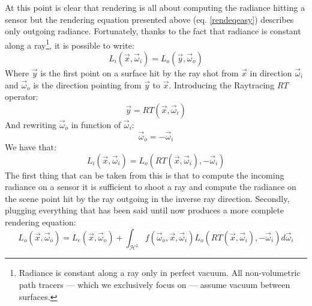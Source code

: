 At this point is clear that rendering is all about computing the radiance hitting a sensor but the rendering equation presented above (eq. \ref{rendeqeasy}) describes only outgoing radiance. Fortunately, thanks to the fact that radiance is constant along a ray\footnote{Radiance is constant along a ray only in perfect vacuum. All non-volumetric path tracers --- which we exclusively focus on --- assume vacuum between surfaces.}, it is possible to write:
\begin{equation}
	L_i(\vec{x},\vec{\omega}_i) = L_o(\vec{y},\vec{\omega}_o)
\end{equation}
Where $\vec{y}$ is the first point on a surface hit by the ray shot from $\vec{x}$ in direction $\vec{\omega}_i$ and $\vec{\omega}_o$ is the direction pointing from $\vec{y}$ to $\vec{x}$. Introducing the Raytracing $RT$ operator:
\begin{equation}
	\vec{y} = RT(\vec{x},\vec{\omega}_i)
\end{equation}
And rewriting $\vec{\omega}_o$ in function of $\vec{\omega}_i$:
\begin{equation}
	\vec{\omega}_o = -\vec{\omega}_i
\end{equation}
We have that:
\begin{equation}
	L_i(\vec{x},\vec{\omega}_i) = L_o(RT(\vec{x},\vec{\omega}_i),-\vec{\omega}_i)
	\label{lilo}
\end{equation}
The first thing that can be taken from this is that to compute the incoming radiance on a sensor it is sufficient to shoot a ray and compute the radiance on the scene point hit by the ray outgoing in the inverse ray direction. Secondly, plugging everything that has been said until now produces a more complete rendering equation:
\begin{equation}
	L_o(\vec{x},\vec{\omega}_o) = 
		L_e(\vec{x},\vec{\omega}_o) + 
		\int_{\mathcal{H}^2} 
			f(\vec{\omega}_o, \vec{x}, \vec{\omega}_i)
			L_o(RT(\vec{x},\vec{\omega}_i),-\vec{\omega}_i)
			d\vec{\omega}_i
	\label{renderingeq}
\end{equation}


